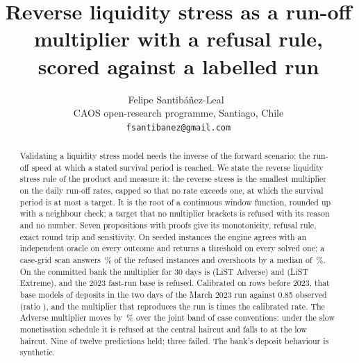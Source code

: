 \documentclass[11pt]{article}
\title{Reverse liquidity stress as a run-off multiplier with a refusal rule, scored against a labelled run}
\author{Felipe Santib\'a\~nez-Leal~\orcidlink{0000-0002-0150-3246}\\
\small CAOS open-research programme, Santiago, Chile\\
\small \texttt{fsantibanez@gmail.com}}
\date{\docdate}
\begin{document}
\maketitle
\headerblock

\begin{abstract}
Validating a liquidity stress model needs the inverse of the forward scenario: the run-off speed at which a stated survival period is reached.
We state the reverse liquidity stress rule of the product and measure it: the reverse stress is the smallest multiplier on the daily run-off rates, capped so that no rate exceeds one, at which the survival period is at most a target.
It is the root of a continuous window function, rounded up with a neighbour check; a target that no multiplier brackets is refused with its reason and no number.
Seven propositions with proofs give its monotonicity, refusal rule, exact round trip and sensitivity.
On \kInst{} seeded instances the engine agrees with an independent oracle on every outcome and returns a threshold on every solved one; a case-grid scan answers \kGFalse{}\,\% of the refused instances and overshoots by a median of \kGErrPc{}\,\%.
On the committed bank the multiplier for 30 days is \mAdv{} (LiST Adverse) and \mExt{} (LiST Extreme), and the 2023 fast-run base is refused.
Calibrated on rows before 2023, that base models \svbModel{} of deposits in the two days of the March 2023 run against 0.85 observed (ratio \svbRatio{}), and the multiplier that reproduces the run is \mSvb{} times the calibrated rate.
The Adverse multiplier moves by \jointDevAdv{}\,\% over the joint band of case conventions: under the slow monetisation schedule it is refused at the central haircut and falls to \lowSlowM{} at the low haircut.
Nine of twelve predictions held; three failed.
The bank's deposit behaviour is synthetic.
\end{abstract}
















\end{document}
